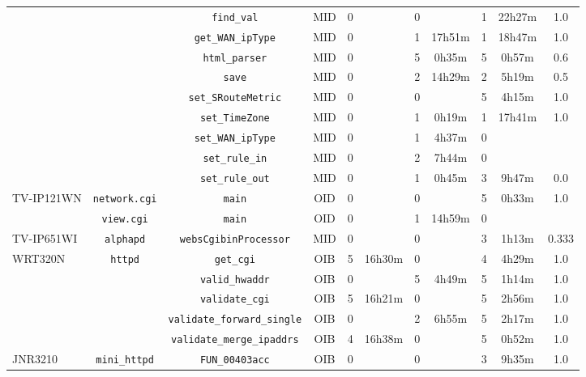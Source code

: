 \begin{table}[ht]
\begin{tabular}{|l||c|c|c|c|c|c|c|c|c|c|}
\cline{3-11}
 &  & \texttt{find\_val} & MID & 0 &  & 0 &  & 1 & 22h27m & 1.0 \\
\cline{3-11}
 &  & \texttt{get\_WAN\_ipType} & MID & 0 &  & 1 & 17h51m & 1 & 18h47m & 1.0 \\
\cline{3-11}
 &  & \texttt{html\_parser} & MID & 0 &  & 5 & 0h35m & 5 & 0h57m & 0.6 \\
\cline{3-11}
 &  & \texttt{save} & MID & 0 &  & 2 & 14h29m & 2 & 5h19m & 0.5 \\
\cline{3-11}
 &  & \texttt{set\_SRouteMetric} & MID & 0 &  & 0 &  & 5 & 4h15m & 1.0 \\
\cline{3-11}
 &  & \texttt{set\_TimeZone} & MID & 0 &  & 1 & 0h19m & 1 & 17h41m & 1.0 \\
\cline{3-11}
 &  & \texttt{set\_WAN\_ipType} & MID & 0 &  & 1 & 4h37m & 0 &  &  \\
\cline{3-11}
 &  & \texttt{set\_rule\_in} & MID & 0 &  & 2 & 7h44m & 0 &  &  \\
\cline{3-11}
 &  & \texttt{set\_rule\_out} & MID & 0 &  & 1 & 0h45m & 3 & 9h47m & 0.0 \\
\cline{3-11}
\cline{2-11}
\cline{1-1}
\multirow{2}{*}{TV-IP121WN} & \multirow{1}{*}{\texttt{network.cgi}} & \texttt{main} & OID & 0 &  & 0 &  & 5 & 0h33m & 1.0 \\
\cline{3-11}
\cline{2-11}
 & \multirow{1}{*}{\texttt{view.cgi}} & \texttt{main} & OID & 0 &  & 1 & 14h59m & 0 &  &  \\
\cline{3-11}
\cline{2-11}
\cline{1-1}
\multirow{1}{*}{TV-IP651WI} & \multirow{1}{*}{\texttt{alphapd}} & \texttt{websCgibinProcessor} & MID & 0 &  & 0 &  & 3 & 1h13m & 0.333 \\
\cline{3-11}
\cline{2-11}
\cline{1-1}
\multirow{5}{*}{WRT320N} & \multirow{5}{*}{\texttt{httpd}} & \texttt{get\_cgi} & OIB & 5 & 16h30m & 0 &  & 4 & 4h29m & 1.0 \\
\cline{3-11}
 &  & \texttt{valid\_hwaddr} & OIB & 0 &  & 5 & 4h49m & 5 & 1h14m & 1.0 \\
\cline{3-11}
 &  & \texttt{validate\_cgi} & OIB & 5 & 16h21m & 0 &  & 5 & 2h56m & 1.0 \\
\cline{3-11}
 &  & \texttt{validate\_forward\_single} & OIB & 0 &  & 2 & 6h55m & 5 & 2h17m & 1.0 \\
\cline{3-11}
 &  & \texttt{validate\_merge\_ipaddrs} & OIB & 4 & 16h38m & 0 &  & 5 & 0h52m & 1.0 \\
\cline{3-11}
\cline{2-11}
\cline{1-1}
\multirow{4}{*}{JNR3210} & \multirow{2}{*}{\texttt{mini\_httpd}} & \texttt{FUN\_00403acc} & OIB & 0 &  & 0 &  & 3 & 9h35m & 1.0 \\

\end{tabular}
\end{table}
